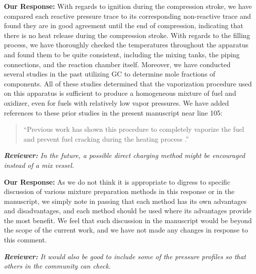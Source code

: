 \documentclass{article}
\newenvironment{reviewer}{\vspace{0.5\baselineskip}\begingroup\itshape\textbf{Reviewer:}}{\endgroup\vspace{0.5\baselineskip}}
\newenvironment{response}{\vspace{0.5\baselineskip}\textbf{Our Response:}}{\vspace{0.5\baselineskip}}
\begin{document}
\begin{response}
    With regards to ignition during the compression stroke, we have compared each reactive pressure
    trace to its corresponding non-reactive trace and found they are in good agreement until the end
    of compression, indicating that there is no heat release during the compression stroke. With
    regards to the filling process, we have thoroughly checked the temperatures throughout the
    apparatus and found them to be quite consistent, including the mixing tanks, the piping
    connections, and the reaction chamber itself. Moreover, we have conducted several studies in the
    past utilizing GC to determine mole fractions of components. All of these studies determined
    that the vaporization procedure used on this apparatus is sufficient to produce a homogeneous
    mixture of fuel and oxidizer, even for fuels with relatively low vapor pressures. We have added
    references to these prior studies in the present manuscript near line 105:

    \begin{quote}
        ``Previous work has shown this procedure to completely vaporize the fuel and prevent fuel
        cracking during the heating process \cite{Weber2011a,Kumar2009,Das2012}.''
    \end{quote}
\end{response}

\begin{reviewer}
    In the future, a possible direct charging method might be encouraged instead of a mix vessel.
\end{reviewer}

\begin{response}
    As we do not think it is appropriate to digress to specific discussion of various mixture
    preparation methods in this response or in the manuscript, we simply note in passing that each
    method has its own advantages and disadvantages, and each method should be used where its
    advantages provide the most benefit. We feel that such discussion in the manuscript would be
    beyond the scope of the current work, and we have not made any changes in response to this
    comment.
\end{response}

\begin{reviewer}
    It would also be good to include some of the pressure profiles so that others in the community
    can check.
\end{reviewer}
\end{document}
